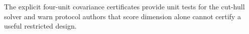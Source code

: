 The explicit four-unit covariance certificates provide unit tests for the cut-hull solver and warn protocol authors that score dimension alone cannot certify a useful restricted design.